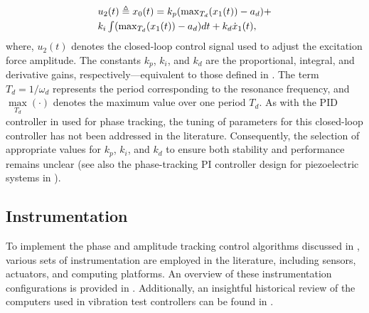 \documentclass[lettersize,journal]{IEEEtran}
\begin{document}
\begin{equation}
\begin{array}{l}
u_2(t) \triangleq x_0(t)=k_{p} (\max_{T_d}(x_1(t))-a_d) + \vspace{0.1cm} \\
k_{i} \int (\max_{T_d}(x_1(t))-a_d) dt + k_d \dot{x}_1(t),
\end{array}
\label{E_PID_amplitude}
\end{equation}
where, $u_2(t)$ denotes the closed-loop control signal used to adjust the excitation force amplitude. The constants $k_p$, $k_i$, and $k_d$ are the proportional, integral, and derivative gains, respectively—equivalent to those defined in . The term $T_d = 1/\omega_d$ represents the period corresponding to the resonance frequency, and $\max\limits_{T_d}(\cdot)$ denotes the maximum value over one period $T_d$. As with the PID controller in  used for phase tracking, the tuning of parameters for this closed-loop controller has not been addressed in the literature. Consequently, the selection of appropriate values for $k_p$, $k_i$, and $k_d$ to ensure both stability and performance remains unclear (see also the phase-tracking PI controller design for piezoelectric systems in \cite{s22176378}).

\subsection{Instrumentation} \label{S_instrumentation}

To implement the phase and amplitude tracking control algorithms discussed in , various sets of instrumentation are employed in the literature, including sensors, actuators, and computing platforms. An overview of these instrumentation configurations is provided in . Additionally, an insightful historical review of the computers used in vibration test controllers can be found in \cite{Computers}.
\end{document}
